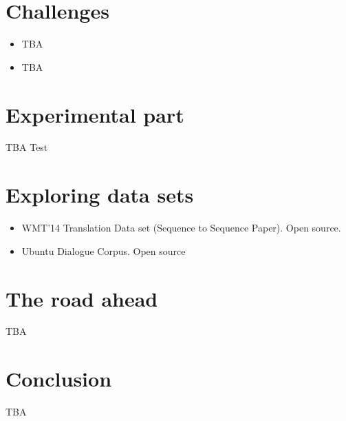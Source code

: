 \documentclass{article} %
\begin{document}


\section{Challenges}
\begin{itemize}
    \item TBA
    \item TBA 
\end{itemize}

\section{Experimental part}
TBA
Test 
\section{Exploring data sets}

\begin{itemize}
    \item WMT'14 Translation Data set (Sequence to Sequence Paper). Open source.
    \item Ubuntu Dialogue Corpus. Open source
\end{itemize}

\section{The road ahead}
TBA

\section{Conclusion}
TBA
\end{document}
